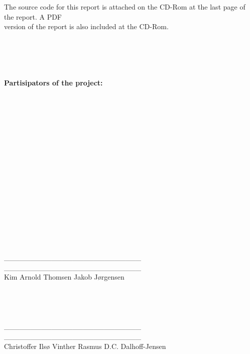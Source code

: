 \begin{tabbing}


The source code for this report is attached on the CD-Rom at \= the last page of the report. A PDF \\
version of the report is also included at the CD-Rom.

\\ \\ \\ \\ 

\textbf{Partisipators of the project:}

\\ \\ \\ \\ \\ \\ \\ \\ \\ \\ \\ \\ \\ \\ \\ \\
\_\_\_\_\_\_\_\_\_\_\_\_\_\_\_\_\_\_\_\_\_\_\_\_\_\_ \> \_\_\_\_\_\_\_\_\_\_\_\_\_\_\_\_\_\_\_\_\_\_\_\_\_\_
\\
Kim Arnold Thomsen \> Jakob J\o{}rgensen\\ \\ \\
\\
\\
\_\_\_\_\_\_\_\_\_\_\_\_\_\_\_\_\_\_\_\_\_\_\_\_\_\_  \> \_\_\_\_\_\_\_\_\_\_\_\_\_\_\_\_\_\_\_\_\_\_\_\_\_\_
\\
Christoffer Ils\o{} Vinther \> Rasmus D.C. Dalhoff-Jensen\\ \\ \\
\\

\end{tabbing}
